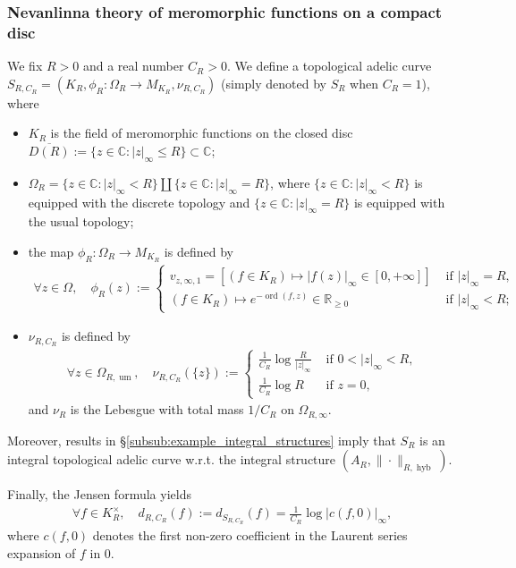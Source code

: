 \documentclass [11pt,reqno]{amsart}
\def\bC{{\mathbb{C}}}
\def\bR{{\mathbb{R}}}
\newcommand{\1}{\mathmybb{1}}
\def\hyb{\operatorname{hyb}}
\def\ord{\operatorname{ord}}
\def\um{\operatorname{um}}
\begin{document}
\subsubsection{Nevanlinna theory of meromorphic functions on a compact disc}
\label{subsub:example_tac_Nevanlinnaç_compact_disc}

We fix $R>0$ and a real number $C_{R}>0$. We define a topological adelic curve $S_{R,C_{R}}=(K_R,\phi_R:\Omega_R\to M_{K_R},\nu_{R,C_{R}})$ (simply denoted by $S_{R}$ when $C_{R}=1$), where 
\begin{itemize}
	\item $K_R$ is the field of meromorphic functions on the closed disc $\overline{D(R)}:=\{z\in \bC : |z|_{\infty}\leq R\} \subset \bC$;
	\item $\Omega_R = \{z\in\bC:|z|_{\infty}<R\}\coprod \{z\in\bC :|z|_{\infty}=R\}$, where $\{z\in\bC:|z|_{\infty}<R\}$ is equipped with the discrete topology and $\{z\in\bC :|z|_{\infty}=R\}$ is equipped with the usual topology;
	\item the map $\phi_R : \Omega_R \to M_{K_R}$ is defined by
	\begin{align*}
	\forall z\in \Omega, \quad \phi_R(z) := \left\{\begin{matrix}
v_{z,\infty,1}=[(f\in K_R) \mapsto |f(z)|_{\infty}\in [0,+\infty]] &\text{ if } |z|_{\infty}=R,\\
(f\in K_R)\mapsto e^{-\ord(f,z)}\in \bR_{\geq 0} &\text{ if } |z|_{\infty}<R;\end{matrix}\right.
	\end{align*}
	\item $\nu_{R,C_{R}}$ is defined by
	\begin{align*}
	\forall z\in \Omega_{R,\um}, \quad \nu_{R,C_{R}}(\{z\}) := \left\{\begin{matrix}
\frac{1}{C_{R}}\log\frac{R}{|z|_{\infty}} &\text{ if } 0<|z|_{\infty}<R,\\
\frac{1}{C_{R}}\log R &\text{ if } z= 0,\end{matrix}\right.
\end{align*}		
	and $\nu_R$ is the Lebesgue with total mass $1/C_{R}$ on $\Omega_{R,\infty}$.
\end{itemize}
Moreover, results in \S \ref{subsub:example_integral_structures} imply that $S_R$ is an integral topological adelic curve w.r.t. the integral structure $(A_{R},\|\cdot\|_{R,\hyb})$.

Finally, the Jensen formula yields
\begin{align*}
\forall f\in K_R^{\times},\quad d_{R,C_{R}}(f) := d_{S_{R,C_{R}}}(f) = \frac{1}{C_{R}}\log|c(f,0)|_{\infty},
\end{align*} 
where $c(f,0)$ denotes the first non-zero coefficient in the Laurent series expansion of $f$ in $0$. 
\end{document}
